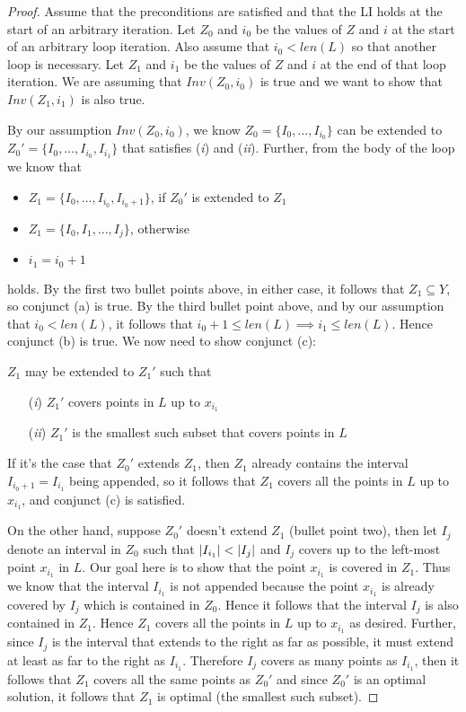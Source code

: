 \begin{proof}
    Assume that the preconditions are satisfied and that the LI holds
    at the start of an arbitrary iteration. Let $Z_0$ and $i_0$ be the 
    values of $Z$ and $i$ at the start of an arbitrary loop iteration.
    Also assume that $i_0 < len(L)$ so that another loop is necessary. 
    Let $Z_1$ and $i_1$ be the values of $Z$ and $i$ at the end of that 
    loop iteration. We are assuming that $Inv(Z_0, i_0)$ is true and we
    want to show that $Inv(Z_1, i_1)$ is also true.
    
    By our assumption $Inv(Z_0, i_0)$, we know $Z_0 = \{ I_0, \dots, I_{i_{0}} \}$
    can be extended to $Z_0' = \{ I_0, \dots, I_{i_{0}}, I_{i_{1}} \}$
    that satisfies (\emph{i}) and (\emph{ii}).
    Further, from the body of the loop we know that
    \begin{itemize}
        \item $Z_1 = \{ I_0, \dots, I_{i_{0}}, I_{i_{0}+1} \}$, if $Z_0'$ is extended
        to $Z_1$
        \item $Z_1 = \{ I_0, I_1, \dots, I_{j} \}$, otherwise
        \item $i_1 = i_0 + 1$
    \end{itemize}
    holds. By the first two bullet points above, in either case, it follows 
    that $Z_1 \subseteq Y$, so conjunct (a) is true.
    By the third bullet point above, and by our assumption that
    $i_0 < len(L)$, it follows that $i_0 + 1 \leqslant len(L)
    \implies i_1 \leqslant len(L)$. Hence conjunct (b) is true.
    We now need to show conjunct (c):
    
    $Z_1$ may be extended to $Z_1'$ such that
    \begin{itemize}
        \item [(\emph{i})] $Z_1'$ covers points in $L$ up to $x_{i_{1}}$
        \item [(\emph{ii})] $Z_1'$ is the smallest such subset that covers points in $L$
    \end{itemize}
    If it's the case that $Z_0'$ extends $Z_1$, then $Z_1$ already contains the
    interval $I_{i_{0} + 1} = I_{i_{1}}$ being appended, so it follows that
    $Z_1$ covers all the points in $L$ up to $x_{i_{1}}$, and conjunct (c) is 
    satisfied.
    
    On the other hand, suppose $Z_0'$ doesn't extend $Z_1$ (bullet point two), then
    let $I_j$ denote an interval in $Z_0$ such that $\left | I_{i_{1}} \right | < \left | I_j \right |$
    and $I_j$ covers up to the left-most point $x_{i_{1}}$ in $L$.
    Our goal here is to show that the point $x_{i_{1}}$ is covered in $Z_1$.
    Thus we know that the interval $I_{i_{1}}$ is not appended because the point
    $x_{i_{1}}$ is already covered by $I_j$ which is contained in $Z_0$. Hence
    it follows that the interval $I_j$ is also contained in $Z_1$. Hence
    $Z_1$ covers all the points in $L$ up to $x_{i_{1}}$ as desired.
    Further, since $I_j$ is the interval that extends to the right as far
    as possible, it must extend at least as far to the right as $I_{i_{1}}$.
    Therefore $I_j$ covers as many points as $I_{i_{1}}$, then it follows that
    $Z_1$ covers all the same points as $Z_0'$ and since $Z_0'$ is an optimal 
    solution, it follows that $Z_1$ is optimal (the smallest such subset).
    

\end{proof}
